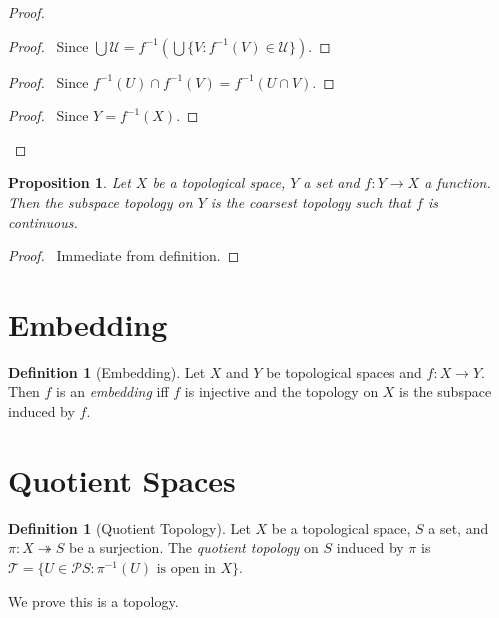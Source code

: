\documentclass{book}
\let\qed\relax
\newtheorem{prop}[ax]{Proposition}
\theoremstyle{definition}
\newtheorem{df}[ax]{Definition}
\newcommand{\inv}[1]{\ensuremath{{#1}^{-1}}}
\begin{document}
\begin{proof}
\pf
{}
\begin{proof}
	\pf\ Since $\bigcup \mathcal{U} = \inv{f}(\bigcup \{ V : \inv{f}(V) \in \mathcal{U}\})$.
\end{proof}
\begin{proof}
	\pf\ Since $\inv{f}(U) \cap \inv{f}(V) = \inv{f}(U 
\cap V)$.
\end{proof}
\begin{proof}
	\pf\ Since $Y = \inv{f}(X)$.
\end{proof}
\qed
\end{proof}

\begin{prop}
Let $X$ be a topological space, $Y$ a set and $f : Y \rightarrow X$ a function. Then the subspace topology on $Y$ is the coarsest topology such that $f$ is continuous.
\end{prop}

\begin{proof}
\pf\ Immediate from definition. \qed
\end{proof}

\section{Embedding}

\begin{df}[Embedding]
Let $X$ and $Y$ be topological spaces and $f : X \rightarrow Y$. Then $f$ is an \emph{embedding} iff $f$ is injective and the topology on $X$ is the subspace induced by $f$.
\end{df}

\section{Quotient Spaces}

\begin{df}[Quotient Topology]
Let $X$ be a topological space, $S$ a set, and $\pi : X \twoheadrightarrow S$ be a surjection. The \emph{quotient topology} on $S$ induced by $\pi$ is $\mathcal{T} = \{ U \in \mathcal{P} S : \inv{\pi}(U) \text{ is open in } X \}$.

We prove this is a topology.
\end{df}
\end{document}
